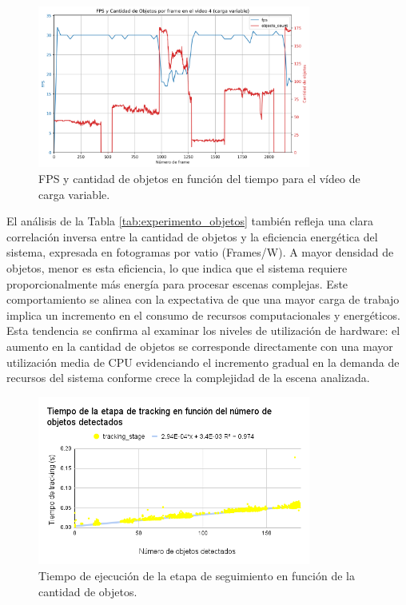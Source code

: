 \documentclass[11pt,spanish,listoffigures,listoftables]{tfgetsinf}
\begin{document}
\begin{figure}
   \centering
   \includegraphics[width=0.8\textwidth]{excels/inferencia/cantidad_objetos/resultados/variable_fps_vs_object_count/fps_vs_object_count.png}
   \caption[FPS y cantidad de objetos en función del tiempo para el vídeo de carga variable]{FPS y cantidad de objetos en función del tiempo para el vídeo de carga variable.}
   \label{fig:fps_vs_object_count}
\end{figure}

El análisis de la Tabla \ref{tab:experimento_objetos} también refleja una clara correlación inversa entre la cantidad de objetos y la eficiencia energética del sistema, expresada en fotogramas por vatio (Frames/W). A mayor densidad de objetos, menor es esta eficiencia, lo que indica que el sistema requiere proporcionalmente más energía para procesar escenas complejas. Este comportamiento se alinea con la expectativa de que una mayor carga de trabajo implica un incremento en el consumo de recursos computacionales y energéticos. Esta tendencia se confirma al examinar los niveles de utilización de hardware: el aumento en la cantidad de objetos se corresponde directamente con una mayor utilización media de CPU evidenciando el incremento gradual en la demanda de recursos del sistema conforme crece la complejidad de la escena analizada.



\begin{figure}[H]
   \centering
   \includegraphics[width=0.8\textwidth]{images/analisis_de_la_solucion/cantidad_objetos/tiempo_etapa_tracking_cantidad_objetos.png}
   \caption[Tiempo de ejecución de la etapa de seguimiento en función de la cantidad de objetos]{Tiempo de ejecución de la etapa de seguimiento en función de la cantidad de objetos.}
   \label{fig:tiempo_etapa_tracking_cantidad_objetos}
\end{figure}
\end{document}

